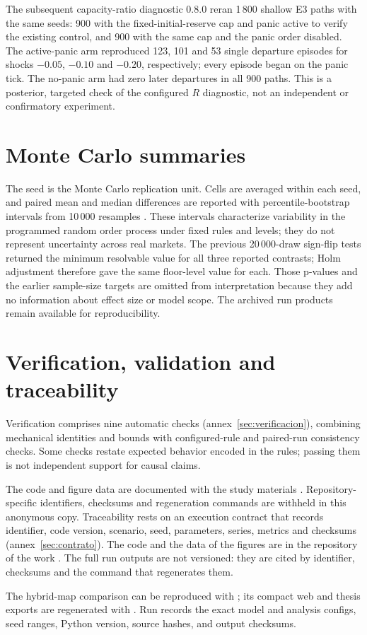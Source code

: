 The subsequent capacity-ratio diagnostic 0.8.0 reran 1\,800 shallow E3 paths with the same seeds: 900 with the fixed-initial-reserve cap and panic active to verify the existing control, and 900 with the same cap and the panic order disabled. The active-panic arm reproduced 123, 101 and 53 single departure episodes for shocks $-0.05$, $-0.10$ and $-0.20$, respectively; every episode began on the panic tick. The no-panic arm had zero later departures in all 900 paths. This is a posterior, targeted check of the configured $R$ diagnostic, not an independent or confirmatory experiment.

\section{Monte Carlo summaries}
\label{sec:analisis-estadistico}

The seed is the Monte Carlo replication unit. Cells are averaged within each seed, and paired mean and median differences are reported with percentile-bootstrap intervals from 10\,000 resamples \cite{efron1979bootstrap}. These intervals characterize variability in the programmed random order process under fixed rules and levels; they do not represent uncertainty across real markets. The previous 20\,000-draw sign-flip tests returned the minimum resolvable value for all three reported contrasts; Holm adjustment therefore gave the same floor-level value for each. Those p-values and the earlier sample-size targets are omitted from interpretation because they add no information about effect size or model scope. The archived run products remain available for reproducibility.

\section{Verification, validation and traceability}

Verification comprises nine automatic checks (annex~\ref{sec:verificacion}), combining mechanical identities and bounds with configured-rule and paired-run consistency checks. Some checks restate expected behavior encoded in the rules; passing them is not independent support for causal claims.

\ifdefined\blindreviewmode
The code and figure data are documented with the study materials \cite{calderon2026repository}. Repository-specific identifiers, checksums and regeneration commands are withheld in this anonymous copy.
\else
Traceability rests on an execution contract that records identifier, code version, scenario, seed, parameters, series, metrics and checksums (annex~\ref{sec:contrato}). The code and the data of the figures are in the repository of the work \cite{calderon2026repository}. The full run outputs are not versioned: they are cited by identifier, checksums and the command that regenerates them.

The hybrid-map comparison can be reproduced with ; its compact web and thesis exports are regenerated with . Run \code{\HybridRunID} records the exact model and analysis configs, seed ranges, Python version, source hashes, and output checksums.
\fi
